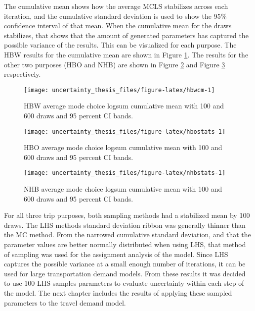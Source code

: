 \documentclass[fancy, masters, twoside]{byuthesis}
\begin{document}
The cumulative mean shows how the average MCLS stabilizes across each iteration, and the cumulative standard deviation is used to show the 95\% confidence interval of that mean. When the cumulative mean for the draws stabilizes, that shows that the amount of generated parameters has captured the possible variance of the results. This can be visualized for each purpose. The HBW results for the cumulative mean are shown in Figure \ref{fig:hbwcm}. The results for the other two purposes (HBO and NHB) are shown in Figure \ref{fig:hbostats} and Figure \ref{fig:nhbstats} respectively.

\begin{figure}

{\centering \texttt{[image: uncertainty\_thesis\_files/figure-latex/hbwcm-1]} 

}

\caption{HBW average mode choice logsum cumulative mean with 100 and 600 draws and 95 percent CI bands.}\label{fig:hbwcm}
\end{figure}

\begin{figure}

{\centering \texttt{[image: uncertainty\_thesis\_files/figure-latex/hbostats-1]} 

}

\caption{HBO average mode choice logsum cumulative mean with 100 and 600 draws and 95 percent CI bands.}\label{fig:hbostats}
\end{figure}

\begin{figure}

{\centering \texttt{[image: uncertainty\_thesis\_files/figure-latex/nhbstats-1]} 

}

\caption{NHB average mode choice logsum cumulative mean with 100 and 600 draws and 95 percent CI bands.}\label{fig:nhbstats}
\end{figure}

For all three trip purposes, both sampling methods had a stabilized mean by 100 draws. The LHS methods standard deviation ribbon was generally thinner than the MC method. From the narrowed cumulative standard deviation, and that the parameter values are better normally distributed when using LHS, that method of sampling was used for the assignment analysis of the model. Since LHS captures the possible variance at a small enough number of iterations, it can be used for large transportation demand models. From these results it was decided to use 100 LHS samples parameters to evaluate uncertainty within each step of the model. The next chapter includes the results of applying these sampled parameters to the travel demand model.
\end{document}
